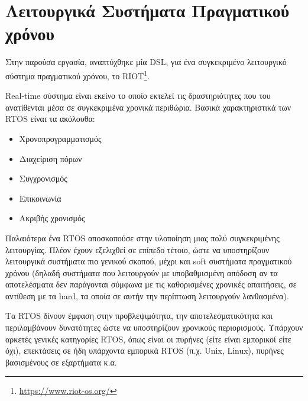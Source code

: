 \section{Λειτουργικά Συστήματα Πραγματικού χρόνου}
\label{sec:theory_rtos}

Στην παρούσα εργασία, αναπτύχθηκε μία DSL, για ένα συγκεκριμένο λειτουργικό σύστημα πραγματικού χρόνου, το RIOT\footnote{\url{https://www.riot-os.org/}}.

Real-time σύστημα είναι εκείνο το οποίο εκτελεί τις δραστηριότητες που του ανατίθενται μέσα σε συγκεκριμένα χρονικά περιθώρια. Βασικά χαρακτηριστικά των RTOS είναι τα ακόλουθα:

\begin{itemize}
	\item Χρονοπρογραμματισμός
	\item Διαχείριση πόρων
	\item Συγχρονισμός
	\item Επικοινωνία
	\item Ακριβής χρονισμός
\end{itemize}
	
Παλαιότερα ένα RTOS αποσκοπούσε στην υλοποίηση μιας πολύ συγκεκριμένης λειτουργίας. Πλέον έχουν εξελιχθεί σε επίπεδο τέτοιο, ώστε να υποστηρίζουν λειτουργικά συστήματα πιο γενικού σκοπού, μέχρι και soft συστήματα πραγματικού χρόνου (δηλαδή συστήματα που λειτουργούν με υποβαθμισμένη απόδοση αν τα αποτελέσματα δεν παράγονται σύμφωνα με τις καθορισμένες χρονικές απαιτήσεις, σε αντίθεση με τα hard, τα οποία σε αυτήν την περίπτωση λειτουργούν λανθασμένα).

Τα RTOS δίνουν έμφαση στην προβλεψιμότητα, την αποτελεσματικότητα και περιλαμβάνουν δυνατότητες ώστε να υποστηρίζουν χρονικούς περιορισμούς. Υπάρχουν αρκετές γενικές κατηγορίες RTOS, όπως είναι οι πυρήνες (είτε είναι εμπορικοί είτε όχι), επεκτάσεις σε ήδη υπάρχοντα εμπορικά RTOS (π.χ. Unix, Linux), πυρήνες βασισμένους σε εξαρτήματα κ.α. \cite{bib:stankovic_2004}